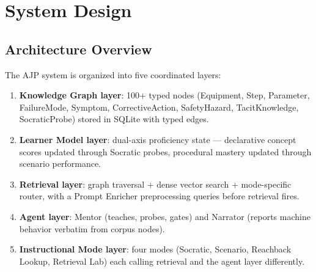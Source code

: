 \documentclass[10pt,letterpaper,twocolumn]{article}
\begin{document}
\section{System Design}
\label{sec:system-design}

\subsection{Architecture Overview}
\label{sec:architecture-overview}

The AJP system is organized into five coordinated layers:
\begin{enumerate}
  \item \textbf{Knowledge Graph layer}: 100+ typed nodes (Equipment, Step, Parameter, FailureMode, Symptom, CorrectiveAction, SafetyHazard, TacitKnowledge, SocraticProbe) stored in SQLite with typed edges.
  \item \textbf{Learner Model layer}: dual-axis proficiency state --- declarative concept scores updated through Socratic probes, procedural mastery updated through scenario performance.
  \item \textbf{Retrieval layer}: graph traversal + dense vector search + mode-specific router, with a Prompt Enricher preprocessing queries before retrieval fires.
  \item \textbf{Agent layer}: Mentor (teaches, probes, gates) and Narrator (reports machine behavior verbatim from corpus nodes).
  \item \textbf{Instructional Mode layer}: four modes (Socratic, Scenario, Reachback Lookup, Retrieval Lab) each calling retrieval and the agent layer differently.
\end{enumerate}
\end{document}
